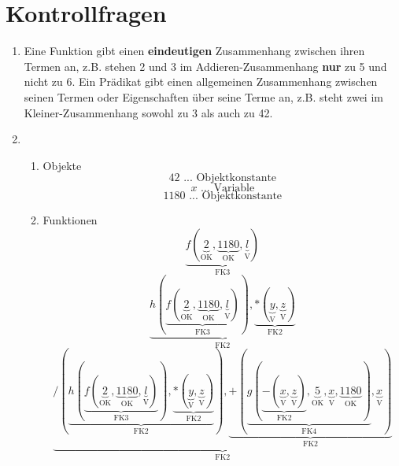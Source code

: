 \documentclass[a4paper]{article}
\begin{document}
	\section{Kontrollfragen}
	
	\begin{enumerate}
		\item
		Eine Funktion gibt einen \textbf{eindeutigen} Zusammenhang zwischen ihren Termen an, z.B. stehen 2 und 3 im Addieren-Zusammenhang \textbf{nur} zu 5 und nicht zu 6.
		\newline
		Ein Prädikat gibt einen allgemeinen Zusammenhang zwischen seinen Termen oder Eigenschaften über seine Terme an, z.B. steht zwei im Kleiner-Zusammenhang sowohl zu 3 als auch zu 42.
		
		\item
		\begin{enumerate}
			\item Objekte
			\begin{equation*}
				42 \text{ ... Objektkonstante}
			\end{equation*}
			\begin{equation*}
				x \text{ ... Variable}
			\end{equation*}
			\begin{equation*}
				1180 \text{ ... Objektkonstante}
			\end{equation*}
		
			\item Funktionen
			\begin{equation*}
				\underbrace{f(\underbrace{2}_{\text{OK}}, \underbrace{1180}_{\text{OK}}, \underbrace{l}_{\text{V}})}_{\text{FK3}}
			\end{equation*}
			\begin{equation*}
				\underbrace{h(\underbrace{f(\underbrace{2}_{\text{OK}}, \underbrace{1180}_{\text{OK}}, \underbrace{l}_{\text{V}})}_{\text{FK3}}), \underbrace{*(\underbrace{y}_{\text{V}}, \underbrace{z}_{\text{V}})}_{\text{FK2}}}_{\text{FK2}}
			\end{equation*}
			\begin{equation*}
				\underbrace{/(\underbrace{h(\underbrace{f(\underbrace{2}_{\text{OK}}, \underbrace{1180}_{\text{OK}}, \underbrace{l}_{\text{V}})}_{\text{FK3}}), \underbrace{*(\underbrace{y}_{\text{V}}, \underbrace{z}_{\text{V}})}_{\text{FK2}}}_{\text{FK2}}), \underbrace{+(\underbrace{g(\underbrace{-(\underbrace{x}_{\text{V}}, \underbrace{z}_{\text{V}})}_{\text{FK2}}, \underbrace{5}_{\text{OK}}, \underbrace{x}_{\text{V}}, \underbrace{1180}_{\text{OK}})}_{\text{FK4}}, \underbrace{x}_{\text{V}})}_{\text{FK2}}}_{\text{FK2}}
			\end{equation*}
			

\end{enumerate}
\end{enumerate}
\end{document}
